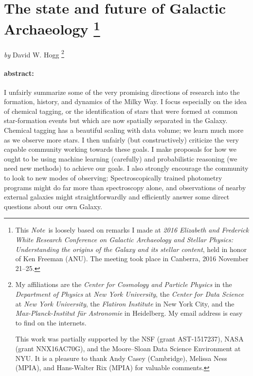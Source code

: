 \documentclass[11pt, letterpaper]{article}
\newcommand{\documentname}{\textsl{Note}}
\begin{document}
\section*{The state and future of Galactic Archaeology%
\footnote{This \documentname\ is loosely based on remarks I made at
  \textsl{2016 Elizabeth and Frederick White Research Conference on
    Galactic Archaeology and Stellar Physics: Understanding the
    origins of the Galaxy and its stellar content}, held in honor of
  Ken Freeman (ANU). The meeting took place in Canberra, 2016 November 21--25.\label{foot:conference}}}

\noindent
\textit{by} {David W. Hogg}%
\footnote{My affiliations are the \textsl{Center for Cosmology and
    Particle Physics} in the \textsl{Department of Physics} at \textsl{New York University}, the
  \textsl{Center for Data Science} at \textsl{New York University}, the
  \textsl{Flatiron Institute} in New York City, and the
  \textsl{Max-Planck-Institut f\"ur Astronomie} in Heidelberg. My email address
  is easy to find on the internets.
  
  This work
  was partially supported by the NSF (grant AST-1517237), NASA (grant
  NNX16AC70G), and the Moore--Sloan Data Science Environment at
  NYU. It is a pleasure to thank Andy Casey (Cambridge), Melissa Ness
  (MPIA), and Hans-Walter Rix (MPIA) for valuable comments.}

\paragraph{abstract:}
I unfairly summarize some of the very promising directions of research
into the formation, history, and dynamics of the Milky Way. I focus
especially on the idea of chemical tagging, or the identification of
stars that were formed at common star-formation events but which are
now spatially separated in the Galaxy. Chemical tagging has a
beautiful scaling with data volume; we learn much more as we observe
more stars. I then unfairly (but constructively) criticize the very
capable community working towards these goals. I make proposals for
how we ought to be using machine learning (carefully) and
probabilistic reasoning (we need new methods) to achieve our goals.  I
also strongly encourage the community to look to new modes of
observing: Spectroscopically trained photometry programs might do far
more than spectroscopy alone, and observations of nearby external
galaxies might straightforwardly and efficiently answer some direct
questions about our own Galaxy.
\end{document}
